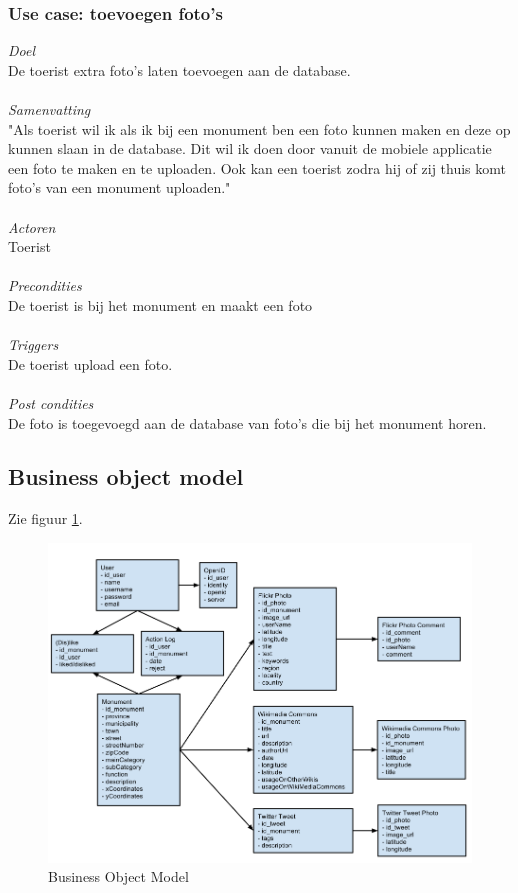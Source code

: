 \documentclass[a4paper,10pt]{article}
\newcommand{\rsubsection}[1]{
\subsection{#1}\label{sec:sub:#1}
}
\newcommand{\rsubsubsection}[1]{
\subsubsection{#1}\label{sec:sub:sub:#1}
}
\begin{document}
			\rsubsubsection{Use case: toevoegen foto's}
			\textit{Doel}\\
			De toerist extra foto's laten toevoegen aan de database.\\ \\
			\textit{Samenvatting}\\
			"Als toerist wil ik als ik bij een monument ben een foto kunnen maken en deze op kunnen slaan in de database. Dit wil ik doen door vanuit de mobiele applicatie een foto te maken en te uploaden. Ook kan een toerist zodra hij of zij thuis komt foto's van een monument uploaden."\\ \\
			\textit{Actoren}\\
			Toerist\\ \\
			\textit{Precondities}\\
			De toerist is bij het monument en maakt een foto\\ \\
			\textit{Triggers}\\
			De toerist upload een foto.\\ \\
			\textit{Post condities}\\
			De foto is toegevoegd aan de database van foto's die bij het monument horen.
	\rsubsection{Business object model}
		Zie figuur \ref{bom}.
		\begin{figure}[ht!]
			\centering
			\includegraphics[width=\textwidth]{BusinessObjectModel.png}
			\caption{Business Object Model \label{bom}}
		\end{figure}
\end{document}
